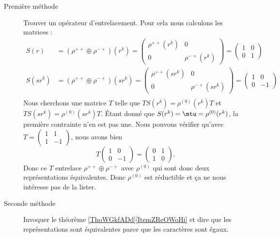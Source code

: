 \begin{enumerate}
\begin{description}
            \item[Première méthode]
                Trouver un opérateur d'entrelacement. Pour cela nous calculons les matrices :
        \begin{subequations}
            \begin{align}
                S(r)&=(\rho^{++}\oplus \rho^{-+})(r^k)=\begin{pmatrix}
                    \rho^{++}(r^k)    &   0    \\
                    0  &   \rho^{-+}(r^k)
                \end{pmatrix}=\begin{pmatrix}
                    1    &   0    \\
                    0    &   1
                \end{pmatrix}\\
                S(sr^k)&=(\rho^{++}\oplus \rho^{-+})(sr^k)=\begin{pmatrix}
                    \rho^{++}(sr^k)    &   0    \\
                    0  &   \rho^{-+}(sr^k)
                \end{pmatrix}=\begin{pmatrix}
                    1    &   0    \\
                    0    &   -1
                \end{pmatrix}\\
            \end{align}
        \end{subequations}
        Nous cherchons une matrice \( T\) telle que \( TS(r^k)=\rho^{(0)}(r^k)T\) et \( TS(sr^k)=\rho^{(0)}(sr^k)T\). Étant donné que \( S(r^k)=\mtu=\rho^{(0)}(r^k)\), la première contrainte n'en est pas une. Nous pouvons vérifier qu'avec \( T=\begin{pmatrix}
            1    &   1    \\
            1    &   -1
        \end{pmatrix}\), nous avons bien
        \begin{equation}
            T\begin{pmatrix}
                1    &   0    \\
                0    &   -1
            \end{pmatrix}=\begin{pmatrix}
                0    &   1    \\
                1    &   0
            \end{pmatrix}.
        \end{equation}
        Donc ce \( T\) entrelace \( \rho^{++}\oplus \rho^{-+}\) avec \( \rho^{(0)}\) qui sont donc deux représentations équivalentes. Donc \( \rho^{(0)}\) est réductible et ça ne nous intéresse pas de la lister.
            \item[Seconde méthode]
                Invoquer le théorème \ref{ThoWGkfADd}\ref{ItemZReOWoHi} et dire que les représentations sont équivalentes parce que les caractères sont égaux.


\end{description}
\end{enumerate}
